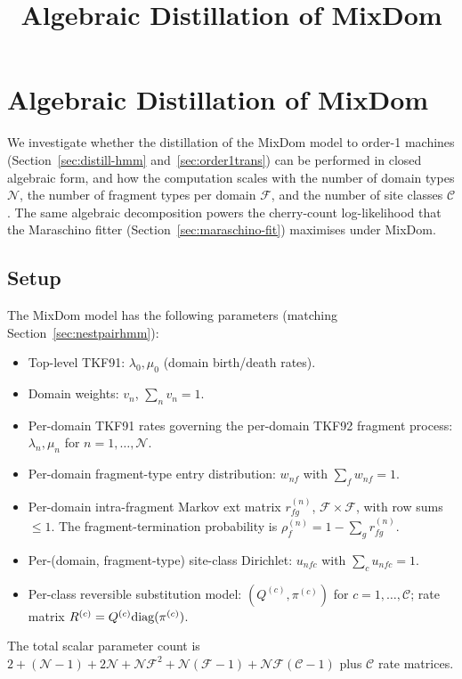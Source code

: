 \documentclass{article}
\title{Algebraic Distillation of MixDom}
\author{}
\newcommand\insrate{\lambda}
\newcommand\delrate{\mu}
\newcommand\ext{r}
\newcommand\notext{\rho}
\newcommand\main{0}
\newcommand\dom{n}
\newcommand\ndom{\mathcal{N}}
\newcommand\nfrag{\mathcal{F}}
\newcommand\domdist{v}
\newcommand\fragdist{w}
\newcommand\classdist{u}
\newcommand\eqm{\pi}
\providecommand\revsub{R}
\providecommand\exch{Q}
\newcommand\frag{f}
\newcommand\srcfrag{f}
\newcommand\destfrag{g}
\newcommand\class{c}
\newcommand\nclasses{\mathcal{C}}
\begin{document}
\maketitle
\fi

\section{Algebraic Distillation of MixDom}
\label{sec:algebraic-distillation}

We investigate whether the distillation of the MixDom model
to order-1 machines (Section~\ref{sec:distill-hmm} and~\ref{sec:order1trans})
can be performed in closed algebraic form, and how the computation scales
with the number of domain types $\ndom$, the number of fragment types
per domain $\nfrag$, and the number of site classes $\nclasses$.
The same algebraic decomposition powers the cherry-count log-likelihood
that the Maraschino fitter (Section~\ref{sec:maraschino-fit}) maximises
under MixDom.

\subsection{Setup}

The MixDom model has the following parameters
(matching Section~\ref{sec:nestpairhmm}):
\begin{itemize}
\item Top-level TKF91: $\insrate_\main, \delrate_\main$ (domain birth/death rates).
\item Domain weights: $\domdist_\dom$, $\sum_\dom \domdist_\dom = 1$.
\item Per-domain TKF91 rates governing the per-domain TKF92 fragment process:
  $\insrate_\dom, \delrate_\dom$ for $\dom = 1, \ldots, \ndom$.
\item Per-domain fragment-type entry distribution:
  $\fragdist_{\dom\frag}$ with $\sum_\frag \fragdist_{\dom\frag} = 1$.
\item Per-domain intra-fragment Markov ext matrix
  $\ext^{(\dom)}_{\srcfrag\destfrag}$, $\nfrag \times \nfrag$, with
  row sums $\leq 1$. The fragment-termination probability is
  $\notext^{(\dom)}_\srcfrag = 1 - \sum_\destfrag \ext^{(\dom)}_{\srcfrag\destfrag}$.
\item Per-(domain, fragment-type) site-class Dirichlet:
  $\classdist_{\dom\frag\class}$ with
  $\sum_\class \classdist_{\dom\frag\class} = 1$.
\item Per-class reversible substitution model:
  $(\exch^{(\class)}, \eqm^{(\class)})$ for $\class = 1, \ldots, \nclasses$;
  rate matrix $\revsub^{(\class)} = \exch^{(\class)} \diag(\eqm^{(\class)})$.
\end{itemize}
The total scalar parameter count is $2 + (\ndom-1) + 2\ndom + \ndom\nfrag^2
+ \ndom(\nfrag-1) + \ndom\nfrag(\nclasses-1)$ plus $\nclasses$ rate matrices.
\end{document}
